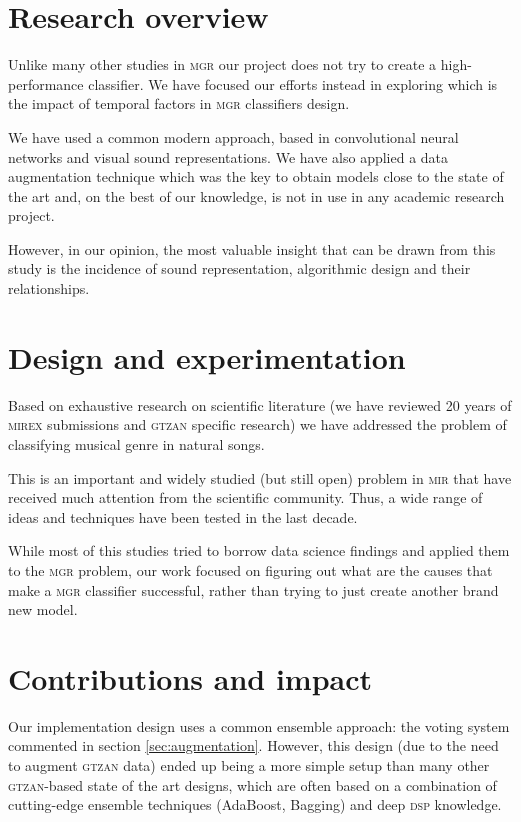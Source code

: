 \section{Research overview}

Unlike many other studies in \textsc{mgr} our project does not try to create a high-performance classifier. We have focused our efforts instead in exploring which is the impact of temporal factors in \textsc{mgr} classifiers design.

We have used a common modern approach, based in convolutional neural networks and visual sound representations. We have also applied a data augmentation technique which was the key to obtain models close to the state of the art and, on the best of our knowledge, is not in use in any academic research project.

However, in our opinion, the most valuable insight that can be drawn from this study is the incidence of sound representation, algorithmic design and their relationships.

\section{Design and experimentation}

Based on exhaustive research on scientific literature (we have reviewed 20 years of \textsc{mirex} submissions and \textsc{gtzan} specific research) we have addressed the problem of classifying musical genre in natural songs.

This is an important and widely studied (but still open) problem in \textsc{mir} that have received much attention from the scientific community. Thus, a wide range of ideas and techniques have been tested in the last decade.

While most of this studies tried to borrow data science findings and applied them to the \textsc{mgr} problem, our work focused on figuring out what are the causes that make a \textsc{mgr} classifier successful, rather than trying to just create another brand new model.

\section{Contributions and impact}

Our implementation design uses a common ensemble approach: the voting system commented in section \ref{sec:augmentation}. However, this design (due to the need to augment \textsc{gtzan} data) ended up being a more simple setup than many other \textsc{gtzan}-based state of the art designs, which are often based on a combination of cutting-edge ensemble techniques (AdaBoost, Bagging) and deep \textsc{dsp} knowledge.

